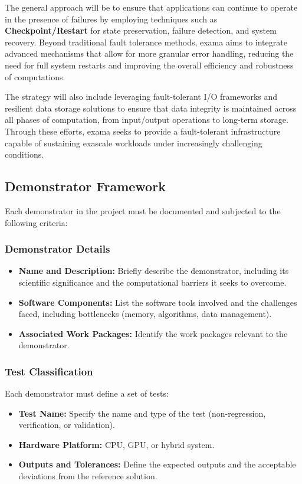 The general approach will be to ensure that applications can continue to operate in the presence of failures by employing techniques such as \textbf{Checkpoint/Restart} for state preservation, failure detection, and system recovery. Beyond traditional fault tolerance methods, \ac{exama} aims to integrate advanced mechanisms that allow for more granular error handling, reducing the need for full system restarts and improving the overall efficiency and robustness of computations.

The strategy will also include leveraging fault-tolerant I/O frameworks and resilient data storage solutions to ensure that data integrity is maintained across all phases of computation, from input/output operations to long-term storage. Through these efforts, \ac{exama} seeks to provide a fault-tolerant infrastructure capable of sustaining exascale workloads under increasingly challenging conditions.


\subsection{Demonstrator Framework}
\label{sec:demonstrators}

Each demonstrator in the \exama project must be documented and subjected to the following criteria:

\subsubsection{Demonstrator Details}
\begin{itemize}
    \item \textbf{Name and Description:} Briefly describe the demonstrator, including its scientific significance and the computational barriers it seeks to overcome.
    \item \textbf{Software Components:} List the software tools involved and the challenges faced, including bottlenecks (memory, algorithms, data management).
    \item \textbf{Associated Work Packages:} Identify the work packages relevant to the demonstrator.
\end{itemize}

\subsubsection{Test Classification}
Each demonstrator must define a set of tests:
\begin{itemize}
    \item \textbf{Test Name:} Specify the name and type of the test (non-regression, verification, or validation).
    \item \textbf{Hardware Platform:} CPU, GPU, or hybrid system.
    \item \textbf{Outputs and Tolerances:} Define the expected outputs and the acceptable deviations from the reference solution.
\end{itemize}

